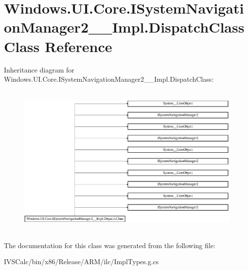 \hypertarget{class_windows_1_1_u_i_1_1_core_1_1_i_system_navigation_manager2_____impl_1_1_dispatch_class}{}\section{Windows.\+U\+I.\+Core.\+I\+System\+Navigation\+Manager2\+\_\+\+\_\+\+Impl.\+Dispatch\+Class Class Reference}
\label{class_windows_1_1_u_i_1_1_core_1_1_i_system_navigation_manager2_____impl_1_1_dispatch_class}
Inheritance diagram for Windows.\+U\+I.\+Core.\+I\+System\+Navigation\+Manager2\+\_\+\+\_\+\+Impl.\+Dispatch\+Class\+:\begin{figure}[H]
\begin{center}
\leavevmode
\includegraphics[height=7.661692cm]{class_windows_1_1_u_i_1_1_core_1_1_i_system_navigation_manager2_____impl_1_1_dispatch_class}
\end{center}
\end{figure}


The documentation for this class was generated from the following file\+:\begin{DoxyCompactItemize}
\item 
I\+V\+S\+Calc/bin/x86/\+Release/\+A\+R\+M/ilc/Impl\+Types.\+g.\+cs\end{DoxyCompactItemize}
